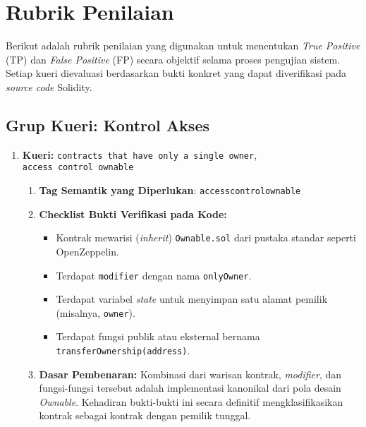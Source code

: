 \chapter{Rubrik Penilaian}
\label{appendix:rubrik-penilaian}

Berikut adalah rubrik penilaian yang digunakan untuk menentukan \textit{True Positive} (TP) dan \textit{False Positive} (FP) secara objektif selama proses pengujian sistem. Setiap kueri dievaluasi berdasarkan bukti konkret yang dapat diverifikasi pada \textit{source code} Solidity.

\section{Grup Kueri: Kontrol Akses}
\begin{enumerate}
    \item \textbf{Kueri:} \texttt{contracts that have only a single owner}, \\\texttt{access control ownable}
    \begin{enumerate}
        \item \textbf{Tag Semantik yang Diperlukan}: \texttt{access\textunderscore control\textunderscore ownable}
        \item \textbf{Checklist Bukti Verifikasi pada Kode:}
        \begin{itemize}
            \item Kontrak mewarisi (\textit{inherit}) \texttt{Ownable.sol} dari pustaka standar seperti OpenZeppelin.
            \item Terdapat \texttt{modifier} dengan nama \texttt{onlyOwner}.
            \item Terdapat variabel \textit{state} untuk menyimpan satu alamat pemilik (misalnya, \texttt{\textunderscore owner}).
            \item Terdapat fungsi publik atau eksternal bernama \\\texttt{transferOwnership(address)}.
        \end{itemize}
        \item \textbf{Dasar Pembenaran:} Kombinasi dari warisan kontrak, \textit{modifier}, dan fungsi-fungsi tersebut adalah implementasi kanonikal dari pola desain \textit{Ownable}. Kehadiran bukti-bukti ini secara definitif mengklasifikasikan kontrak sebagai kontrak dengan pemilik tunggal.
    \end{enumerate}
\end{enumerate}

